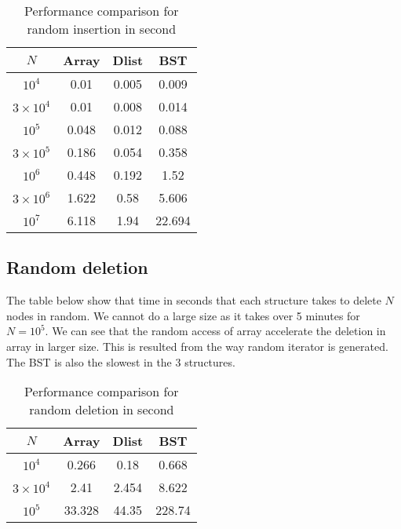 \documentclass{article}
\begin{document}
	
	\begin{table}[h]
	\begin{center}
	\begin{tabular}{|c|c|c|c|}
	\hline 
	$N$ & Array & Dlist & BST \\ 
	\hline 
	$10^4$ & 0.01 & 0.005 & 0.009 \\ 
	\hline 
	$3 \times 10^4$ & 0.01 & 0.008 & 0.014\\ 
	\hline 
	$10^5$ & 0.048 & 0.012 & 0.088 \\ 
	\hline 
	$3 \times 10^5$ & 0.186 & 0.054 & 0.358 \\ 
	\hline 
	$10^6$ & 0.448 & 0.192 & 1.52 \\ 
	\hline 
	$3 \times 10^6$ & 1.622 & 0.58 & 5.606 \\ 
	\hline 
	$10^7$ & 6.118 & 1.94 & 22.694 \\ 
	\hline 
	\end{tabular} 
	
	\end{center}
	\caption{Performance comparison for random insertion in second}
	\end{table}
	
	\pagebreak
	
	\subsection{Random deletion}
	The table below show that time in seconds that each structure takes to delete $N$ nodes in random. We cannot do a large size as it takes over 5 minutes for $N = 10^5$. 
	We can see that the random access of array accelerate the deletion in array in larger size. This is resulted from the way random iterator is generated. The BST is also the slowest in the 3 structures.
	
	\begin{table}[h]
	\begin{center}
	\begin{tabular}{|c|c|c|c|}
	\hline 
	$N$ & Array & Dlist & BST \\ 
	\hline 
	$10^4$ & 0.266 & 0.18 & 0.668 \\ 
	\hline 
	$3 \times 10^4$ & 2.41 & 2.454 & 8.622\\ 
	\hline 
	$10^5$ & 33.328 & 44.35 & 228.74 \\ 
	\hline 
	\end{tabular} 
	
	\end{center}
	\caption{Performance comparison for random deletion in second}
	\end{table}
	
\end{document}
